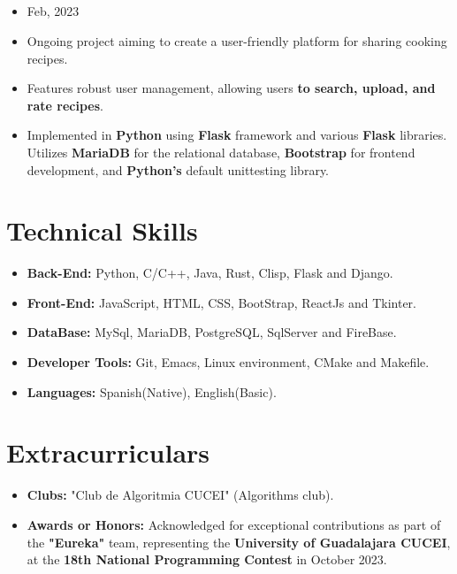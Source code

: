 \documentclass[11pt]{article}
\begin{document}
\subsection*{\href{https://github.com/alecksandr26/recipe-app-web}{\color{blue}{Cooking Recipes Web App:}}}
\vspace{-0.3cm}
\begin{itemize}[noitemsep, nolistsep]
\item Feb, 2023
\item Ongoing project aiming to create a user-friendly platform for sharing cooking recipes.
\item Features robust user management, allowing users \textbf{to search, upload, and rate recipes}.
\item Implemented in \textbf{Python} using \textbf{Flask} framework and various \textbf{Flask} libraries.
  Utilizes \textbf{MariaDB} for the relational database,
  \textbf{Bootstrap} for frontend development, and \textbf{Python's} default unittesting library.
\end{itemize}

\vspace{-0.5cm}
\section*{Technical Skills}
\vspace{-0.3cm}
\titlerule[0.3pt]
\vspace{0.1cm}

\begin{itemize}[noitemsep, nolistsep]
\item \textbf{Back-End:} Python, C/C++, Java, Rust, Clisp, Flask and Django.
\item \textbf{Front-End:} JavaScript, HTML, CSS, BootStrap, ReactJs and Tkinter.
\item \textbf{DataBase:} MySql, MariaDB, PostgreSQL, SqlServer and FireBase.
\item \textbf{Developer Tools:} Git, Emacs, Linux environment, CMake and Makefile.
\item \textbf{Languages:} Spanish(Native), English(Basic).
\end{itemize}
\vspace{-0.5cm}

\section*{Extracurriculars}
\vspace{-0.3cm}
\titlerule[0.3pt]
\vspace{0.1cm}
\begin{itemize}[noitemsep, nolistsep]
\item \textbf{Clubs:} "Club de Algoritmia CUCEI" (Algorithms club).
\item \textbf{Awards or Honors:} Acknowledged for exceptional contributions as part of the \textbf{"Eureka"}
  team, representing the \textbf{University of Guadalajara CUCEI}, at the
  \textbf{18th National Programming Contest} in October 2023.
\end{itemize}
\end{document}
